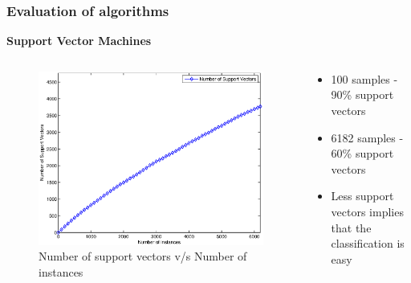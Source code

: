 \documentclass[9pt]{beamer}
\begin{document}
    \begin{frame}
        \frametitle{Evaluation of algorithms}
        \begin{center}
            \textbf{Support Vector Machines}
        \end{center}
        \begin{columns}
            \begin{column}{0.5\textwidth}
                \begin{figure}
                    \centering
                    \includegraphics[width=\textwidth]{figures/svm_n_sv.eps}
                    \caption{Number of support vectors v/s Number of instances}
                \end{figure}
            \end{column}
            \begin{column}{0.5\textwidth}
                \begin{itemize}
                    \item{100 samples - 90\% support vectors}
                    \item{6182 samples - 60\% support vectors}
                    \item{Less support vectors implies that the classification is easy}
                \end{itemize}
            \end{column}
        \end{columns}
    \end{frame}
    
\end{document}
